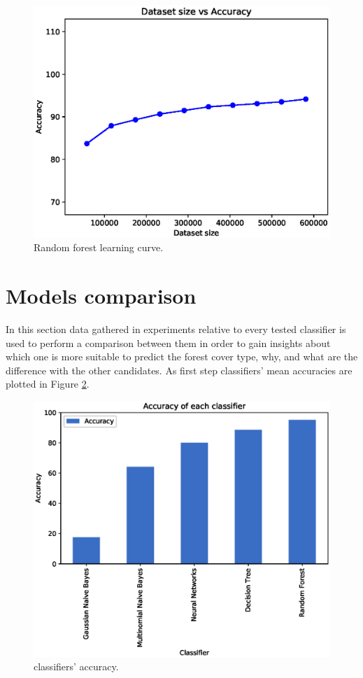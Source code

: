 \documentclass[a4paper, 10pt]{article}
\begin{document}
\begin{figure}[H]
 \centering
 \includegraphics[width=0.8\linewidth]{pictures/random_forest_size_vs_accuracy.eps}
 \caption{Random forest learning curve.}
 \label{fig:rf_learning}
\end{figure}

\section{Models comparison}
In this section data gathered in experiments relative to every tested classifier is used to perform a comparison between them in order to gain insights about which one is more suitable to predict the forest cover type, why, and what are the difference with the other candidates. As first step classifiers' mean accuracies are plotted in Figure \ref{fig:comp_accuracies}.

\begin{figure}[H]
 \centering
 \includegraphics[width=0.8\linewidth]{pictures/comp_accuracies.eps}
 \caption{classifiers' accuracy.}
 \label{fig:comp_accuracies}
\end{figure}
\end{document}
